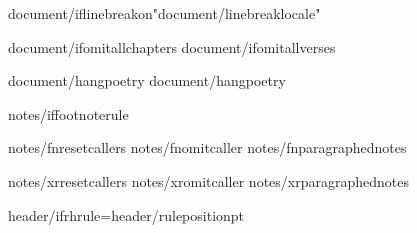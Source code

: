 {document/iflinebreakon}\XeTeXlinebreaklocale "{document/linebreaklocale}"

{document/ifomitallchapters}\def\AfterChapterSpaceFactor{{10}}
{document/ifomitallverses}\def\AfterVerseSpaceFactor{{0}}

{document/hangpoetry}
{document/hangpoetry}


{notes/iffootnoterule}\def\footnoterule{{}} 

{notes/fnresetcallers}
{notes/fnomitcaller}
{notes/fnparagraphednotes}

{notes/xrresetcallers}
{notes/xromitcaller}
{notes/xrparagraphednotes}

\def\HeaderPosition{{{header/headerposition}}}
\def\FooterPosition{{{header/footerposition}}}
{header/ifrhrule}\RHruleposition={header/ruleposition}pt

\def\RHoddleft{{{header/oddleft}}}
\def\RHoddcenter{{{header/oddcenter}}}
\def\RHoddright{{{header/oddright}}}

\def\RHevenleft{{{header/evenleft}}}
\def\RHevencenter{{{header/evencenter}}}
\def\RHevenright{{{header/evenright}}}


\def\RFoddcenter{{{footer/ftrcenter}}}
\def\RFevencenter{{{footer/ftrcenter}}}
\def\RFtitlecenter{{{footer/ftrcenter}}}

